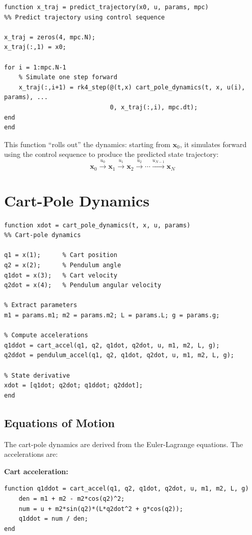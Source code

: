 \documentclass[11pt]{article}
\begin{document}
\begin{lstlisting}
function x_traj = predict_trajectory(x0, u, params, mpc)
%% Predict trajectory using control sequence

x_traj = zeros(4, mpc.N);
x_traj(:,1) = x0;

for i = 1:mpc.N-1
    % Simulate one step forward
    x_traj(:,i+1) = rk4_step(@(t,x) cart_pole_dynamics(t, x, u(i), params), ...
                             0, x_traj(:,i), mpc.dt);
end
end
\end{lstlisting}

This function ``rolls out'' the dynamics: starting from $\mathbf{x}_0$, it simulates forward using the control sequence to produce the predicted state trajectory:
\[
\mathbf{x}_0 \xrightarrow{u_0} \mathbf{x}_1 \xrightarrow{u_1} \mathbf{x}_2 \xrightarrow{u_2} \cdots \xrightarrow{u_{N-1}} \mathbf{x}_N
\]

\section{Cart-Pole Dynamics}

\begin{lstlisting}
function xdot = cart_pole_dynamics(t, x, u, params)
%% Cart-pole dynamics

q1 = x(1);      % Cart position
q2 = x(2);      % Pendulum angle
q1dot = x(3);   % Cart velocity
q2dot = x(4);   % Pendulum angular velocity

% Extract parameters
m1 = params.m1; m2 = params.m2; L = params.L; g = params.g;

% Compute accelerations
q1ddot = cart_accel(q1, q2, q1dot, q2dot, u, m1, m2, L, g);
q2ddot = pendulum_accel(q1, q2, q1dot, q2dot, u, m1, m2, L, g);

% State derivative
xdot = [q1dot; q2dot; q1ddot; q2ddot];
end
\end{lstlisting}

\subsection{Equations of Motion}

The cart-pole dynamics are derived from the Euler-Lagrange equations. The accelerations are:

\textbf{Cart acceleration:}
\begin{lstlisting}
function q1ddot = cart_accel(q1, q2, q1dot, q2dot, u, m1, m2, L, g)
    den = m1 + m2 - m2*cos(q2)^2;
    num = u + m2*sin(q2)*(L*q2dot^2 + g*cos(q2));
    q1ddot = num / den;
end
\end{lstlisting}
\end{document}
